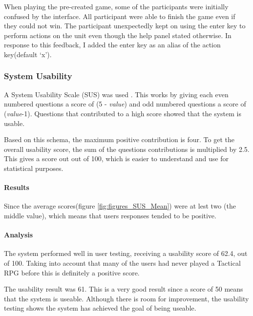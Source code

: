When playing the pre-created game, some of the participants were initially confused by the interface. All participant were able to finish the game even if they could not win.  The participant unexpectedly kept on using the enter key to perform actions on the unit even though the help panel stated otherwise. In response to this feedback, I added the enter key as an alias of the action key(default `x').

\subsubsection{System Usability}
A System Usability Scale (SUS) was used \cite{SUS}. This works by giving each even numbered questions a score of (5 - \emph{value}) and odd numbered questions a score of (\emph{value}-1). Questions that contributed to a high score showed that the system is usable. 

Based on this schema, the maximum positive contribution is four. To get the overall usability score, the sum of the questions contributions is multiplied by 2.5.  This gives  a score out out of 100, which is easier to understand and use for statistical purposes.

\paragraph{Results\\}
Since the average scores(figure \ref{fig:figures_SUS_Mean}) were at lest two (the middle value), which means that users responses tended to be positive. 

\paragraph{Analysis\\}

The system performed well in user testing, receiving a usability score of 62.4, out of 100. Taking into account that many of the users had never played a Tactical RPG before this is definitely a positive score. 

The usability result was 61. This is a very good result since a score of 50 means that the system is useable. Although there is room for improvement, the usability testing shows the system has achieved the goal of being useable.

